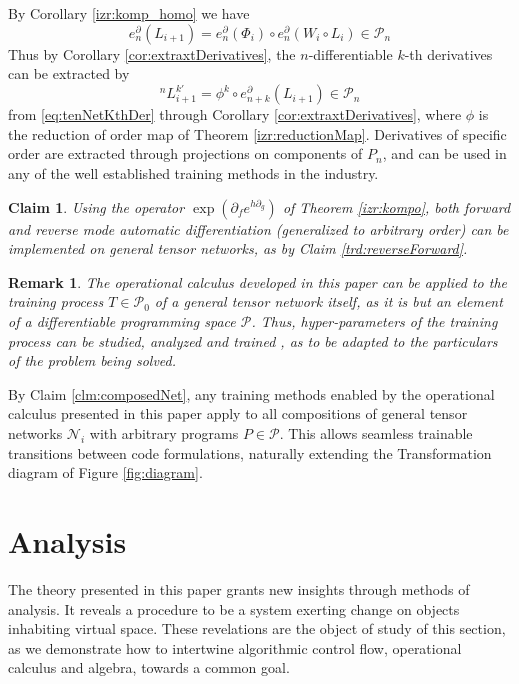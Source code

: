 \documentclass[smallcondensed]{svjour3}
\newcommand{\NN}{\mathcal{N}}
\newcommand{\dP}{\mathcal{P}}
\newcommand{\D}{\partial}
\newtheorem{trditev}{Claim}[section]
\newtheorem{opomba}{Remark}[section]
\begin{document}
By Corollary \ref{izr:komp_homo} we have
\begin{equation}\label{eq:tenNetKthDer}
e^\D_n(L_{i+1})=e^\D_n(\Phi_i)\circ e^\D_n(W_i\circ L_i)\in\dP_n
\end{equation}
Thus by Corollary \ref{cor:extraxtDerivatives}, the $n$-differentiable $k$-th derivatives can be extracted by
\begin{equation}
^{n}L_{i+1}^{k\prime}=\phi^k\circ e^\D_{n+k}(L_{i+1})\in\dP_n
\end{equation}
from \eqref{eq:tenNetKthDer} through Corollary \ref{cor:extraxtDerivatives}, where $\phi$ is the reduction of order map of Theorem \ref{izr:reductionMap}. Derivatives of specific order are extracted through projections on components of $P_n$, and can be used in any of the well established training methods in the industry. 

\begin{trditev}
Using the operator $\exp(\D_fe^{h\D_g})$ of Theorem \ref{izr:kompo}, both forward \cite{PcAD} and reverse \cite{ReverseAD} mode automatic differentiation (generalized to arbitrary order) can be implemented on general tensor networks, as by Claim \ref{trd:reverseForward}.
\end{trditev}

\begin{opomba}
The operational calculus developed in this paper can be applied to the training process $T\in\dP_0$ of a general tensor network itself, as it is but an element of a differentiable programming space $\dP$. Thus, hyper-parameters of the training process \cite{HyperParams} can be studied, analyzed and trained \cite{hyper}, as to be adapted to the particulars of the problem being solved.
\end{opomba}

By Claim \ref{clm:composedNet}, any training methods enabled by the operational calculus presented in this paper apply to all compositions of general tensor networks $\NN_i$ with arbitrary programs $P\in\dP$. This allows seamless trainable transitions between code formulations, naturally extending the Transformation diagram of Figure \ref{fig:diagram}. 
  
\section{Analysis}\label{sec:Analysis}
  
   The theory presented in this paper grants new insights through methods of analysis. It reveals a procedure to be a system exerting change on objects inhabiting virtual space. These revelations are the object of study of this section, as we demonstrate how to intertwine algorithmic control flow, operational calculus and algebra, towards a common goal.  
  
\end{document}
